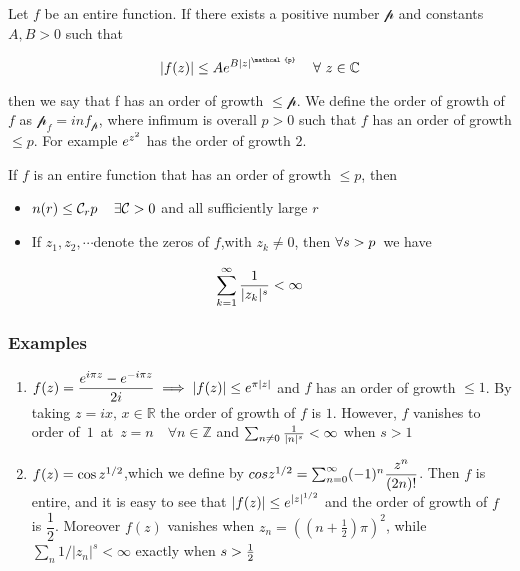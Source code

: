\documentclass[11pt]{article}
\providecommand{\tightlist}{%
      \setlength{\itemsep}{0pt}\setlength{\parskip}{0pt}}
\begin{document}
Let \(f\) be an entire function. If there exists a positive number
\(\mathcal{p}\) and constants \(A,B>0\) such that

\[\large|f(z)| \le Ae^{B|z|^{\mathcal{p}}}\quad\forall\,\,z\in\mathbb{C}\]

then we say that f has an order of growth \(\le\mathcal{p}\). We define
the order of growth of \(f\) as \(\mathcal{p}_{f}=inf_{\mathcal{p}}\),
where infimum is overall \(p>0\) such that \(f\) has an order of growth
\(\le p\). For example \(\large e^{z^{2}}\) has the order of growth
\(2\).

If \(f\) is an entire function that has an order of growth \(\le p\),
then

\begin{itemize}
\tightlist
\item
  \(\large n(r)\le \mathcal{C}_{r}p\quad\exists\mathcal{C}>0\) and all
  sufficiently large \(r\)
\item
  If \(z_{1},z_{2},\cdots\)denote the zeros of \(f\),with \(z_{k}\ne0\),
  then \(\large\forall s>p\,\) we have
\end{itemize}

\[\huge\sum_{k=1}^{\infty}\frac{1}{|z_{k}|^{s}}<\infty\]

\subsubsection{Examples}\label{examples}

\begin{enumerate}
\def\labelenumi{\arabic{enumi})}
\item
  \(\large f(z)=\dfrac{e^{i\pi z}-e^{-i\pi z}}{2i} \implies |f(z)| \le e^{\pi|z|}\)
  and \(f\) has an order of growth \(\le1\). By taking
  \(z=ix,\,x\in\mathbb{R}\) the order of growth of \(f\) is \(1\).
  However, \(f\) vanishes to order of \(\,1\,\) at
  \(\,z=n\quad\forall n\in\mathbb{Z}\) and
  \(\large\sum_{n\ne0}\frac{1}{|n|^{s}} < \infty\) when \(s>1\)
\item
  \(\large f(z)=\cos z^{1/2}\),which we define by
  \(\large cos z^{1/2}=\sum_{n=0}^{\infty}(-1)^{n}\dfrac{z^{n}}{(2n)!}\).
  Then \(f\) is entire, and it is easy to see that
  \(\large|f(z)|\le e^{|z|^{1/2}}\) and the order of growth of \(f\) is
  \(\dfrac{1}{2}\). Moreover \(f(z)\) vanishes when
  \(z_{n}=((n+\frac{1}{2})\pi)^{2}\), while
  \(\sum_{n}1/|z_{n}|^{s} < \infty\) exactly when
  \(\large s>\frac{1}{2}\)
\end{enumerate}
\end{document}
